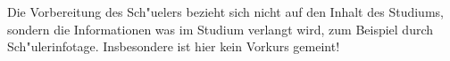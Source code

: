 \begin{kcmt}\begin{komacmt}
Die Vorbereitung des Sch"uelers bezieht sich nicht auf den Inhalt des Studiums, sondern die
Informationen was im Studium verlangt wird, zum Beispiel durch Sch"ulerinfotage. Insbesondere ist hier kein Vorkurs gemeint!
\end{komacmt}\end{kcmt}


\begin{center}
\end{center}

